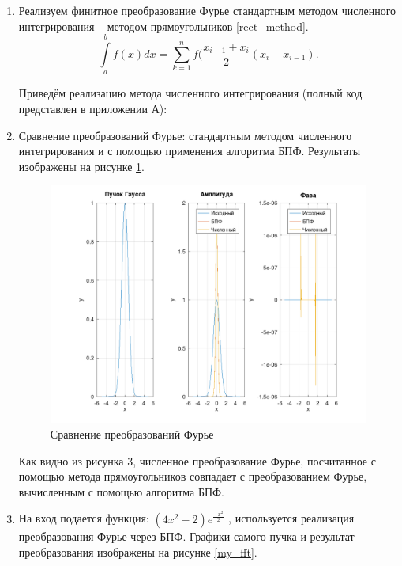 {\begin{enumerate}
		\item{
		Реализуем финитное преобразование Фурье стандартным методом численного интегрирования -- методом прямоугольников \eqref{rect_method}.
		\begin{equation}\label{rect_method}
		\int\limits_a^b f(x) dx = \sum\limits_{k=1}^n f(\dfrac{x_{i - 1} + x_i}{2} (x_i - x_{i - 1}).
		\end{equation}
		
			Приведём реализацию метода численного интегрирования (полный код представлен в приложении А):
			
		}
		
		\item{
		Сравнение преобразований Фурье: стандартным методом численного интегрирования и с помощью применения алгоритма БПФ. Результаты изображены на рисунке \ref{gauss_compare}.
		
			\begin{figure}[H]
				\includegraphics[width=0.75\pagewidth]{gauss_compare}
				\caption{Сравнение преобразований Фурье}
				\label{gauss_compare}
			\end{figure}
			
			Как видно из рисунка 3, численное преобразование Фурье, посчитанное с помощью метода прямоугольников совпадает с преобразованием Фурье, вычисленным с помощью алгоритма БПФ.
		}
		
		\item{
		На вход подается функция: $(4 x^2 - 2) e^{\frac{-x^2}{2}}$ , используется реализация преобразования Фурье через БПФ. Графики самого пучка и результат преобразования изображены на рисунке \ref{my_fft}.
		
}
\end{enumerate}}
